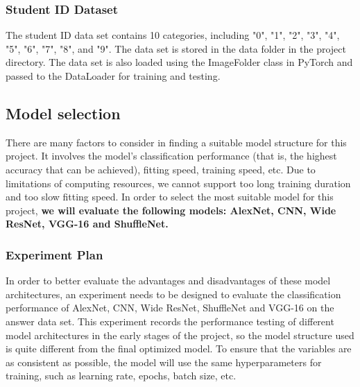 \documentclass[twocolumn]{article}
\begin{document}
        \subsubsection{Student ID Dataset}
        The student ID data set contains 10 categories, including "0", "1", "2", "3", "4", "5", "6", "7", "8", and "9". The data set is stored in the data folder in the project directory. The data set is also loaded using the ImageFolder class in PyTorch and passed to the DataLoader for training and testing.


    \subsection{Model selection}
    There are many factors to consider in finding a suitable model structure for this project. It involves the model's classification performance (that is, the highest accuracy that can be achieved), fitting speed, training speed, etc. Due to limitations of computing resources, we cannot support too long training duration and too slow fitting speed. In order to select the most suitable model for this project, \textbf{we will evaluate the following models: AlexNet, CNN, Wide ResNet, VGG-16 and ShuffleNet.}

        \subsubsection{Experiment Plan}
        In order to better evaluate the advantages and disadvantages of these model architectures, an experiment needs to be designed to evaluate the classification performance of AlexNet, CNN, Wide ResNet, ShuffleNet and VGG-16 on the answer data set. This experiment records the performance testing of different model architectures in the early stages of the project, so the model structure used is quite different from the final optimized model. To ensure that the variables are as consistent as possible, the model will use the same hyperparameters for training, such as learning rate, epochs, batch size, etc.
\end{document}
